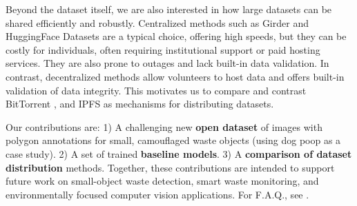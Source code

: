 Beyond the dataset itself, we are also interested in how large datasets can be
shared efficiently and robustly.  Centralized methods such as Girder
\cite{girder_2024} and HuggingFace Datasets \cite{huggingface_datasets} are a
typical choice, offering high speeds, but they can be costly for individuals,
often requiring institutional support or paid hosting services.  They are also
prone to outages and lack built-in data validation.  In contrast, decentralized
methods allow volunteers to host data and offers built-in validation of data
integrity.  This motivates us to compare and contrast BitTorrent
\cite{cohen_incentives_2003}, and IPFS \cite{benet_ipfs_2014} as mechanisms for
distributing datasets.

Our contributions are:
1) A challenging new \textbf{open dataset} of images with polygon annotations for small, camouflaged waste
   objects (using dog poop as a case study).
2) A set of trained \textbf{baseline models}.
3) A \textbf{comparison of dataset distribution} methods.
Together, these contributions are intended to support future work on small-object waste detection, smart
waste monitoring, and environmentally focused computer vision applications.
For F.A.Q., see . 
